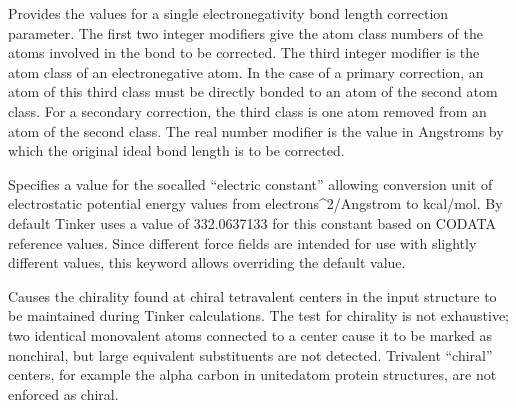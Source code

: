 \documentclass[letterpaper,11pt,english]{sphinxmanual}
\begin{document}
\ignorespaces {}\label{\detokenize{text/keywords:key-electneg}}\begin{description}
\sphinxAtStartPar
Provides the values for a single electronegativity bond length correction parameter. The first two integer modifiers give the atom class numbers of the atoms involved in the bond to be corrected. The third integer modifier is the atom class of an electronegative atom. In the case of a primary correction, an atom of this third class must be directly bonded to an atom of the second atom class. For a secondary correction, the third class is one atom removed from an atom of the second class. The real number modifier is the value in Angstroms by which the original ideal bond length is to be corrected.

\end{description}

\ignorespaces {}\label{\detokenize{text/keywords:key-electric}}\begin{description}
\sphinxAtStartPar
Specifies a value for the so\sphinxhyphen{}called “electric constant” allowing conversion unit of electrostatic potential energy values from electrons\textasciicircum{}2/Angstrom to kcal/mol. By default Tinker uses a value of 332.0637133 for this constant based on CODATA reference values. Since different force fields are intended for use with slightly different values, this keyword allows overriding the default value.

\end{description}

\ignorespaces {}\label{\detokenize{text/keywords:key-enforce-chirality}}\begin{description}
\sphinxAtStartPar
Causes the chirality found at chiral tetravalent centers in the input structure to be maintained during Tinker calculations. The test for chirality is not exhaustive; two identical monovalent atoms connected to a center cause it to be marked as non\sphinxhyphen{}chiral, but large equivalent substituents are not detected. Trivalent “chiral” centers, for example the alpha carbon in united\sphinxhyphen{}atom protein structures, are not enforced as chiral.

\end{description}
\end{document}
